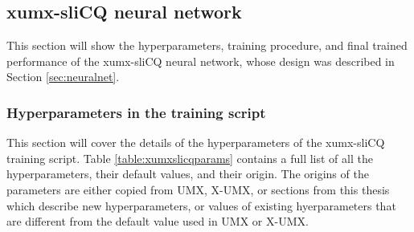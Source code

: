 \documentclass[report.tex]{subfiles}
\begin{document}
\newpagefill

\subsection{xumx-sliCQ neural network}

This section will show the hyperparameters, training procedure, and final trained performance of the xumx-sliCQ neural network, whose design was described in Section \ref{sec:neuralnet}.

\subsubsection{Hyperparameters in the training script}

This section will cover the details of the hyperparameters of the xumx-sliCQ training script. Table \ref{table:xumxslicqparams} contains a full list of all the hyperparameters, their default values, and their origin. The origins of the parameters are either copied from UMX, X-UMX, or sections from this thesis which describe new hyperparameters, or values of existing hyerparameters that are different from the default value used in UMX or X-UMX.
\end{document}
